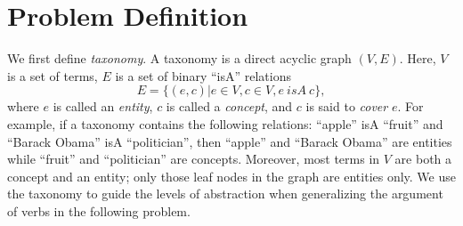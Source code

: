 

\section{Problem Definition}
\label{sec:problem}
We first define {\em taxonomy}.
A taxonomy is a direct acyclic graph $(V, E)$.
Here, $V$ is a set of terms, $E$ is a set of binary ``isA'' relations
\[E=\{(e,c)| e\in V, c\in V, e~ isA~ c\},\]
where $e$ is called an {\em entity},
$c$ is called a {\em concept}, and $c$ is said to {\em cover} $e$.
For example, if a taxonomy contains the following relations:
``apple'' isA ``fruit'' and ``Barack Obama'' isA ``politician'',
then ``apple'' and ``Barack Obama'' are entities while ``fruit''
and ``politician'' are concepts. Moreover, most terms in $V$ are
both a concept and an entity; only those leaf nodes in the graph are
entities only. We use the taxonomy to guide the levels of
abstraction when generalizing the argument of verbs in the following
problem.

